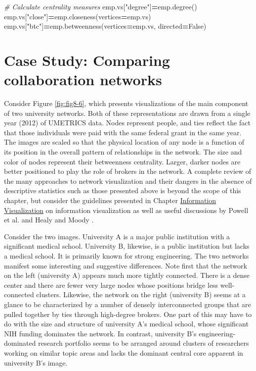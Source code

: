\documentclass[]{krantz}
\newenvironment{Shaded}{\begin{snugshade}}{\end{snugshade}}
\newcommand{\StringTok}[1]{\textcolor[rgb]{0.31,0.60,0.02}{#1}}
\newcommand{\CommentTok}[1]{\textcolor[rgb]{0.56,0.35,0.01}{\textit{#1}}}
\newcommand{\VariableTok}[1]{\textcolor[rgb]{0.00,0.00,0.00}{#1}}
\newcommand{\OperatorTok}[1]{\textcolor[rgb]{0.81,0.36,0.00}{\textbf{#1}}}
\newcommand{\NormalTok}[1]{#1}
\begin{document}
\begin{Shaded}
\begin{Highlighting}[]
\CommentTok{# Calculate centrality measures}
\NormalTok{emp.vs[}\StringTok{"degree"}\NormalTok{]}\OperatorTok{=}\NormalTok{emp.degree()}
\NormalTok{emp.vs[}\StringTok{"close"}\NormalTok{]}\OperatorTok{=}\NormalTok{emp.closeness(vertices}\OperatorTok{=}\NormalTok{emp.vs)}
\NormalTok{emp.vs[}\StringTok{"btc"}\NormalTok{]}\OperatorTok{=}\NormalTok{emp.betweenness(vertices}\OperatorTok{=}\NormalTok{emp.vs, directed}\OperatorTok{=}\VariableTok{False}\NormalTok{)}
\end{Highlighting}
\end{Shaded}

\section{Case Study: Comparing collaboration
networks}\label{case-study-comparing-collaboration-networks}

Consider Figure \ref{fig:fig8-6}, which presents visualizations of the
main component of two university networks. Both of these representations
are drawn from a single year (2012) of UMETRICS data. Nodes represent
people, and ties reflect the fact that those individuals were paid with
the same federal grant in the same year. The images are scaled so that
the physical location of any node is a function of its position in the
overall pattern of relationships in the network. The size and color of
nodes represent their betweenness centrality. Larger, darker nodes are
better positioned to play the role of brokers in the network. A complete
review of the many approaches to network visualization and their dangers
in the absence of descriptive statistics such as those presented above
is beyond the scope of this chapter, but consider the guidelines
presented in Chapter \protect\hyperlink{chap:viz}{Information
Visualization} on information visualization as well as useful
discussions by Powell et al. \citeyearpar{powell2005network} and Healy
and Moody \citeyearpar{healy2014data}.

Consider the two images. University A is a major public institution with
a significant medical school. University B, likewise, is a public
institution but lacks a medical school. It is primarily known for strong
engineering. The two networks manifest some interesting and suggestive
differences. Note first that the network on the left (university A)
appears much more tightly connected. There is a dense center and there
are fewer very large nodes whose positions bridge less well-connected
clusters. Likewise, the network on the right (university B) seems at a
glance to be characterized by a number of densely interconnected groups
that are pulled together by ties through high-degree brokers. One part
of this may have to do with the size and structure of university A's
medical school, whose significant NIH funding dominates the network. In
contrast, university B's engineering-dominated research portfolio seems
to be arranged around clusters of researchers working on similar topic
areas and lacks the dominant central core apparent in university B's
image.
\end{document}
